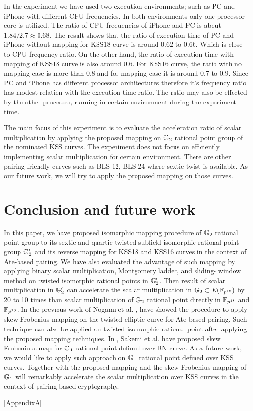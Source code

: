 In the experiment we have used two execution environments; such as PC and iPhone with different CPU frequencies. 
In both environments only one processor core is utilized.
 The ratio of CPU frequencies of  iPhone and PC is about $1.84 / 2.7 \approx 0.68$. 
The result  shows that the ratio of execution time of PC and iPhone without mapping  for KSS18 curve is around $0.62$ to $0.66$.
Which is close to CPU frequency ratio.
On the other hand, the ratio of execution time with mapping  of KSS18 curve is also around $0.6$. 
For KSS16 curve, the ratio with no mapping case is more than $0.8$ and for mapping case it is around $0.7$ to $0.9$.   
Since PC and iPhone has different processor architectures therefore it's frequency ratio has modest relation with the execution time ratio. 
The ratio may also be effected by the other processes, running in certain environment during the experiment time.

The main focus of this experiment is to evaluate the  acceleration ratio of scalar multiplication by applying the proposed mapping on ${\mathbb{G}}_{2}$ rational point group of the nominated KSS curves. The experiment does not focus on efficiently implementing scalar multiplication for certain environment. There are other pairing-friendly curves such as BLS-12, BLS-24 \cite{JC:FreScoTes10} where sextic twist is available. As our future work, we will try to apply the proposed mapping on those curves.

\section{Conclusion and future work}
In this paper, we have proposed isomorphic mapping procedure of ${\mathbb{G}}_{2}$ rational point group to its sextic and quartic twisted subfield isomorphic rational point group ${\mathbb{G}}_{2}'$  and its reverse mapping for KSS18 and KSS16 curves in the context of Ate-based pairing. 
We have also evaluated the advantage of such mapping by applying binary scalar multiplication, Montgomery ladder, and sliding- window method on twisted isomorphic rational points in ${\mathbb{G}}_{2}'$. 
Then result of  scalar multiplication in ${\mathbb{G}}_{2}'$ can accelerate the scalar multiplication in ${\mathbb{G}}_{2} \subset E(\mathbb{F}_{p^{18}})$ by   20 to 10 times than scalar multiplication of ${\mathbb{G}}_{2}$ rational point directly in $\mathbb{F}_{p^{18}}$ and $\mathbb{F}_{p^{16}}$. 
In the previous work of Nogami et al. \cite{DBLP:journals/ieicet/NogamiSONAM09}, have showed the procedure to apply skew Frobenius mapping on the twisted elliptic curve for Ate-based pairing. Such technique can also be applied on twisted isomorphic rational point after applying the proposed mapping techniques.
In \cite{CANS:SNOKM08},  Sakemi et al.  have proposed skew Frobenious map for ${\mathbb{G}}_{1}$ rational point defined over BN curve.
As a future work, we would like to apply such approach on ${\mathbb{G}}_{1}$ rational point defined over KSS curves. Together with the proposed mapping and the skew Frobenius mapping of ${\mathbb{G}}_{1}$ will remarkably accelerate the scalar multiplication over KSS curves in the context of pairing-based cryptography.  

\ref{AppendixA}
